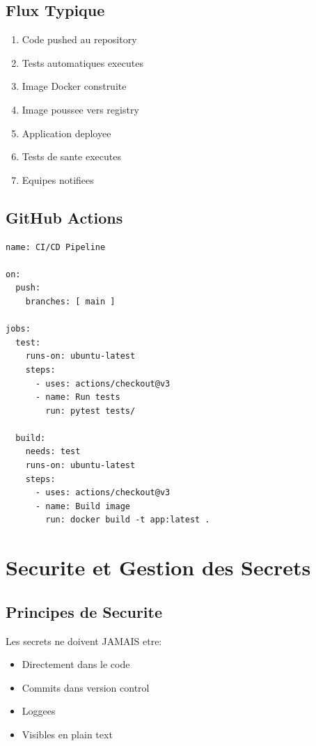 \documentclass[12pt,a4paper]{report}
\begin{document}
\section{Flux Typique}

\begin{enumerate}
    \item Code pushed au repository
    \item Tests automatiques executes
    \item Image Docker construite
    \item Image poussee vers registry
    \item Application deployee
    \item Tests de sante executes
    \item Equipes notifiees
\end{enumerate}

\section{GitHub Actions}

\begin{lstlisting}
name: CI/CD Pipeline

on:
  push:
    branches: [ main ]

jobs:
  test:
    runs-on: ubuntu-latest
    steps:
      - uses: actions/checkout@v3
      - name: Run tests
        run: pytest tests/

  build:
    needs: test
    runs-on: ubuntu-latest
    steps:
      - uses: actions/checkout@v3
      - name: Build image
        run: docker build -t app:latest .
\end{lstlisting}

\newpage

\chapter{Securite et Gestion des Secrets}

\section{Principes de Securite}

Les secrets ne doivent JAMAIS etre:
\begin{itemize}
    \item Directement dans le code
    \item Commits dans version control
    \item Loggees
    \item Visibles en plain text
\end{itemize}
\end{document}
